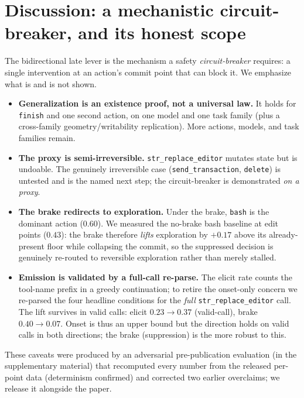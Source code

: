 \documentclass[11pt]{article}
\begin{document}
\section{Discussion: a mechanistic circuit-breaker, and its honest scope}\label{sec:disc}
The bidirectional late lever is the mechanism a safety \emph{circuit-breaker} requires: a single intervention
at an action's commit point that can block it. We emphasize what is and is not shown.
\begin{itemize}\itemsep1pt
  \item \textbf{Generalization is an existence proof, not a universal law.} It holds for \texttt{finish} and
    one second action, on one model and one task family (plus a cross-family geometry/writability replication).
    More actions, models, and task families remain.
  \item \textbf{The proxy is semi-irreversible.} \texttt{str\_replace\_editor} mutates state but is undoable.
    The genuinely irreversible case (\texttt{send\_transaction}, \texttt{delete}) is untested and is the named
    next step; the circuit-breaker is demonstrated \emph{on a proxy}.
  \item \textbf{The brake redirects to exploration.} Under the brake, \texttt{bash} is the dominant action
    (0.60). We measured the no-brake bash baseline at edit points ($0.43$): the brake therefore \emph{lifts}
    exploration by $+0.17$ above its already-present floor while collapsing the commit, so the suppressed
    decision is genuinely re-routed to reversible exploration rather than merely stalled.
  \item \textbf{Emission is validated by a full-call re-parse.} The elicit rate counts the tool-name prefix in
    a greedy continuation; to retire the onset-only concern we re-parsed the four headline conditions for the
    \emph{full} \texttt{str\_replace\_editor} call. The lift survives in valid calls: elicit $0.23 \to 0.37$
    (valid-call), brake $0.40 \to 0.07$. Onset is thus an upper bound but the direction holds on valid calls in
    both directions; the brake (suppression) is the more robust to this.
\end{itemize}
These caveats were produced by an adversarial pre-publication evaluation (in the supplementary material) that
recomputed every number from the released per-point data (determinism confirmed) and corrected two earlier
overclaims; we release it alongside the paper.
\end{document}
